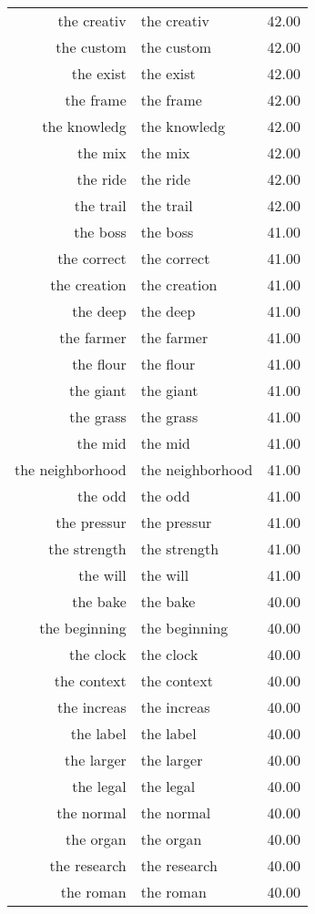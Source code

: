 \begin{table}[ht]
\begin{tabular}{rlr}
  the creativ & the creativ & 42.00 \\ 
  the custom & the custom & 42.00 \\ 
  the exist & the exist & 42.00 \\ 
  the frame & the frame & 42.00 \\ 
  the knowledg & the knowledg & 42.00 \\ 
  the mix & the mix & 42.00 \\ 
  the ride & the ride & 42.00 \\ 
  the trail & the trail & 42.00 \\ 
  the boss & the boss & 41.00 \\ 
  the correct & the correct & 41.00 \\ 
  the creation & the creation & 41.00 \\ 
  the deep & the deep & 41.00 \\ 
  the farmer & the farmer & 41.00 \\ 
  the flour & the flour & 41.00 \\ 
  the giant & the giant & 41.00 \\ 
  the grass & the grass & 41.00 \\ 
  the mid & the mid & 41.00 \\ 
  the neighborhood & the neighborhood & 41.00 \\ 
  the odd & the odd & 41.00 \\ 
  the pressur & the pressur & 41.00 \\ 
  the strength & the strength & 41.00 \\ 
  the will & the will & 41.00 \\ 
  the bake & the bake & 40.00 \\ 
  the beginning & the beginning & 40.00 \\ 
  the clock & the clock & 40.00 \\ 
  the context & the context & 40.00 \\ 
  the increas & the increas & 40.00 \\ 
  the label & the label & 40.00 \\ 
  the larger & the larger & 40.00 \\ 
  the legal & the legal & 40.00 \\ 
  the normal & the normal & 40.00 \\ 
  the organ & the organ & 40.00 \\ 
  the research & the research & 40.00 \\ 
  the roman & the roman & 40.00 \\ 

\end{tabular}
\end{table}

